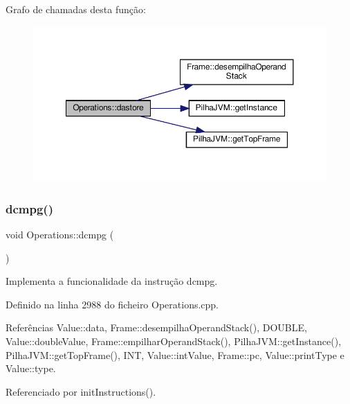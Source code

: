 Grafo de chamadas desta função\+:\nopagebreak
\begin{figure}[H]
\begin{center}
\leavevmode
\includegraphics[width=350pt]{classOperations_a9735fdb8ba4ea2d7b8b32e8d0a5d2f72_cgraph}
\end{center}
\end{figure}
\mbox{\label{classOperations_a7c2a5194de7a2a59ada752001b8ece0a}} 
\subsubsection{\texorpdfstring{dcmpg()}{dcmpg()}}
{\footnotesize\ttfamily void Operations\+::dcmpg (\begin{DoxyParamCaption}{ }\end{DoxyParamCaption})\hspace{0.3cm}{\ttfamily [private]}}



Implementa a funcionalidade da instrução dcmpg. 



Definido na linha 2988 do ficheiro Operations.\+cpp.



Referências Value\+::data, Frame\+::desempilha\+Operand\+Stack(), D\+O\+U\+B\+LE, Value\+::double\+Value, Frame\+::empilhar\+Operand\+Stack(), Pilha\+J\+V\+M\+::get\+Instance(), Pilha\+J\+V\+M\+::get\+Top\+Frame(), I\+NT, Value\+::int\+Value, Frame\+::pc, Value\+::print\+Type e Value\+::type.



Referenciado por init\+Instructions().

